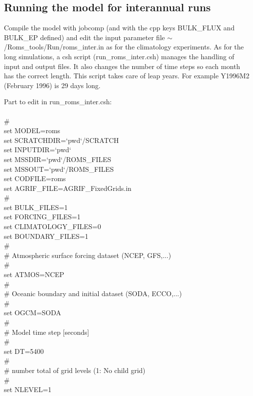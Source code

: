 \subsection{Running the model for interannual runs}

Compile the model with jobcomp (and with the 
cpp keys BULK\_FLUX and BULK\_EP defined) and edit 
the input parameter file 
$\sim$/Roms\_tools/Run/roms\_inter.in as for the
climatology experiments. As for the long simulations, a csh script
(run\_roms\_inter.csh) manages the handling of input and output files.
It also changes the number of time steps so each month has the correct
length. This script takes care of leap years. For example Y1996M2 
(February 1996) is 29 days long.

Part to edit in run\_roms\_inter.csh:\\
\\
\#\\
set MODEL=roms\\
set SCRATCHDIR=`pwd`/SCRATCH\\
set INPUTDIR=`pwd`\\
set MSSDIR=`pwd`/ROMS\_FILES\\
set MSSOUT=`pwd`/ROMS\_FILES\\
set CODFILE=roms\\
set AGRIF\_FILE=AGRIF\_FixedGrids.in\\
\#\\
set BULK\_FILES=1\\
set FORCING\_FILES=1\\
set CLIMATOLOGY\_FILES=0\\
set BOUNDARY\_FILES=1\\
\#\\
\# Atmospheric surface forcing dataset (NCEP, GFS,...)\\
\#\\
set ATMOS=NCEP\\
\#\\
\# Oceanic boundary and initial dataset (SODA, ECCO,...)\\
\#\\
set OGCM=SODA\\
\#\\
\# Model time step [seconds]\\
\#\\
set DT=5400\\
\#\\
\# number total of grid levels (1: No child grid)\\
\#\\
set NLEVEL=1\\
